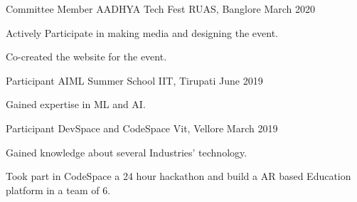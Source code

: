 \begin{cventries}
  \cventry
  {Committee Member}
    {AADHYA Tech Fest}
    {RUAS, Banglore}
    {March 2020}
   { \begin{cvitems}
        \item {Actively Participate in making media and designing the event.}
        \item {Co-created the website for the event.}
    \end{cvitems}
  }
  
    
  \cventry
    {Participant}
    {AIML Summer School}
    {IIT, Tirupati}
    {June 2019}
    {
      \begin{cvitems}
        \item {Gained expertise in ML and AI.}
      \end{cvitems}
    }

    
  \cventry
    {Participant}
    {DevSpace and CodeSpace}
    {Vit, Vellore}
    {March 2019}
    {
      \begin{cvitems}
        \item {Gained knowledge about several Industries' technology.}
        \item {Took part in CodeSpace a 24 hour hackathon and build a AR based Education platform in a team of 6.}
      \end{cvitems}
    }
\end{cventries}
